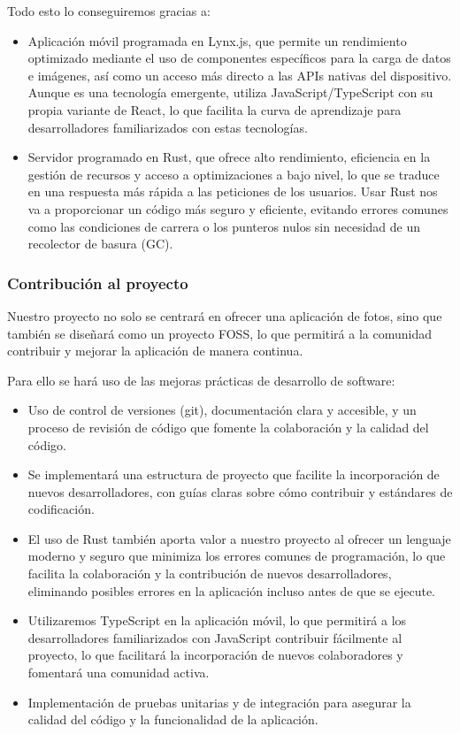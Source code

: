 Todo esto lo conseguiremos gracias a:
\begin{itemize}
    \item Aplicación móvil programada en Lynx.js, que permite un rendimiento optimizado mediante el uso de componentes específicos para la carga de datos e imágenes, así como un acceso más directo a las APIs nativas del dispositivo. Aunque es una tecnología emergente, utiliza JavaScript/TypeScript con su propia variante de React, lo que facilita la curva de aprendizaje para desarrolladores familiarizados con estas tecnologías.
    \item Servidor programado en Rust, que ofrece alto rendimiento, eficiencia en la gestión de recursos y acceso a optimizaciones a bajo nivel, lo que se traduce en una respuesta más rápida a las peticiones de los usuarios. Usar Rust nos va a proporcionar un código más seguro y eficiente, evitando errores comunes como las condiciones de carrera o los punteros nulos sin necesidad de un recolector de basura (GC).
\end{itemize}
\subsubsection{Contribución al proyecto}
Nuestro proyecto no solo se centrará en ofrecer una aplicación de fotos, sino que también se diseñará como un proyecto FOSS, lo que permitirá a la comunidad contribuir y mejorar la aplicación de manera continua.

Para ello se hará uso de las mejoras prácticas de desarrollo de software:
\begin{itemize}
    \item Uso de control de versiones (\Gls{git}), documentación clara y accesible, y un proceso de revisión de código que fomente la colaboración y la calidad del código.
    \item Se implementará una estructura de proyecto que facilite la incorporación de nuevos desarrolladores, con guías claras sobre cómo contribuir y estándares de codificación.
    \item El uso de Rust también aporta valor a nuestro proyecto al ofrecer un lenguaje moderno y seguro que minimiza los errores comunes de programación, lo que facilita la colaboración y la contribución de nuevos desarrolladores, eliminando posibles errores en la aplicación incluso antes de que se ejecute.
    \item Utilizaremos TypeScript en la aplicación móvil, lo que permitirá a los desarrolladores familiarizados con JavaScript contribuir fácilmente al proyecto, lo que facilitará la incorporación de nuevos colaboradores y fomentará una comunidad activa.
    \item Implementación de pruebas unitarias y de integración para asegurar la calidad del código y la funcionalidad de la aplicación.
\end{itemize}
